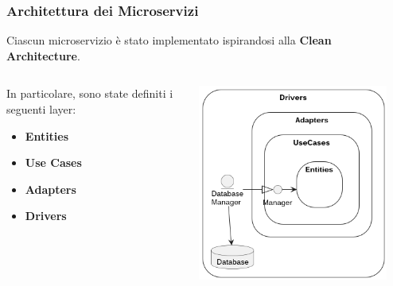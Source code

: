 \begin{frame}
    \frametitle{Architettura dei Microservizi}
    Ciascun microservizio è stato implementato ispirandosi alla \textbf{Clean Architecture}.

    \smallskip

    \begin{columns}
        \begin{column}{0.5\textwidth}
            \begin{addmargin}[0.6em]{2em}
                In particolare, sono state definiti i seguenti layer:
                \begin{itemize}
                    \item \textbf{Entities}
                    \item \textbf{Use Cases}
                    \item \textbf{Adapters}
                    \item \textbf{Drivers}
                \end{itemize}
            \end{addmargin}
        \end{column}
        \begin{column}{0.5\textwidth}
            \begin{center}
                \includegraphics[width=0.9\textwidth]{../img/clean}
            \end{center}
        \end{column}
    \end{columns}


\end{frame}
